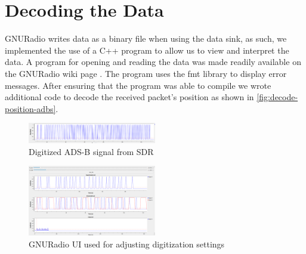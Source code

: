 \documentclass[conference, onecolumn]{IEEEtran}
\begin{document}
\section{Decoding the Data}
GNURadio writes data as a binary file when using the data sink, as such, we implemented the use of a C++ program to allow us to view and interpret the data. A program for opening and reading the data was made readily available on the GNURadio wiki page \cite{gnuradio-reading-file-cpp}. The program uses the fmt library\cite{fmt-library} to display error messages. After ensuring that the program was able to compile we wrote additional code to decode the received packet's position as shown in \autoref{fig:decode-position-adbs}.

\begin{figure}
  \begin{center}
    \includegraphics[width=0.5\textwidth]{./figures/fig_ADSB_recv_digital.png}
  \end{center}
  \caption{Digitized ADS-B signal from SDR}\label{fig:digital}
\end{figure}

\begin{figure}
  \begin{center}
    \includegraphics[width=0.5\textwidth]{./figures/fig_gnuradio_fullUI.png}
  \end{center}
  \caption{GNURadio UI used for adjusting digitization settings}\label{fig:receive_UI}
\end{figure}


\end{document}
